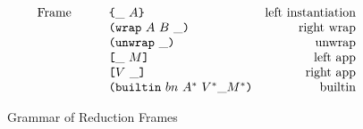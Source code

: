 \documentclass[../main.tex]{subfiles}
\begin{document}
\begin{figure*}[t]
    \centering
    \[\begin{array}{lrclr}
        \textrm{Frame} &   &     & \texttt{\{}\_ ~ A\texttt{\}}                     & \textrm{left instantiation}\\
                       &   &     & \texttt{(} \texttt{wrap} ~ A ~ B ~ \_ \texttt{)}                 & \textrm{right wrap}\\
                       &   &     & \texttt{(} \texttt{unwrap} ~ \_ \texttt{)}{}                        & \textrm{unwrap}\\
                       &   &     & \texttt{[} \_ ~ M \texttt{]}                      & \textrm{left app}\\
                       &   &     & \texttt{[} V ~ \_ \texttt{]}                     & \textrm{right app}\\
                       &   &     & \texttt{(} \texttt{builtin} ~ bn ~ A^* ~ V^* \_ M^* \texttt{)}       & \textrm{builtin}\\
    \end{array}\]
    \caption{Grammar of Reduction Frames}
    \label{fig:Plutus_core_reduction_frames}
\end{figure*}
\end{document}
